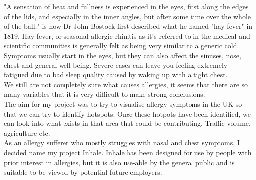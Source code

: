 "A sensation of heat and fullness is experienced in the eyes, first along the edges of the lids, and especially in the inner angles, but after some time over the whole of the ball." is how Dr John Bostock first described what he named "hay fever" in 1819. Hay fever, or seasonal allergic rhinitis as it's referred to in the medical and scientific communities is generally felt as being very similar to a generic cold. Symptoms usually start in the eyes, but they can also affect the sinuses, nose, chest and general well being. Severe cases can leave you feeling extremely fatigued due to bad sleep quality caused by waking up with a tight chest.\\

We still are not completely sure what causes allergies, it seems that there are so many variables that it is very difficult to make strong conclusions.\\

The aim for my project was to try to visualise allergy symptoms in the UK so that we can try to identify hotspots. Once these hotpots have been identified, we can look into what exists in that area that could be contributing. Traffic volume, agriculture etc.\\

As an allergy sufferer who mostly struggles with nasal and chest symptoms, I decided name my project Inhale. Inhale has been designed for use by people with prior interest in allergies, but it is also use-able by the general public and is suitable to be viewed by potential future employers.
